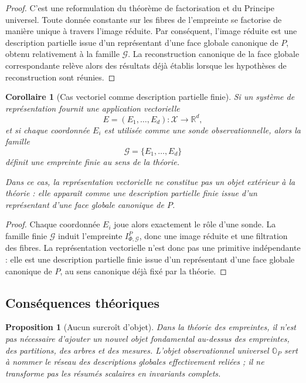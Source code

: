 \documentclass[11pt,a4paper,openany]{book}
\newtheorem{proposition}[definition]{Proposition}
\newtheorem{corollary}[definition]{Corollaire}
\begin{document}
\begin{proof}
C'est une reformulation du théorème de factorisation et du Principe universel. Toute donnée constante sur les fibres de l'empreinte se factorise de manière unique à travers l'image réduite. Par conséquent, l'image réduite est une description partielle issue d'un représentant d'une face globale canonique de \(P\), obtenu relativement à la famille \(\mathcal G\). La reconstruction canonique de la face globale correspondante relève alors des résultats déjà établis lorsque les hypothèses de reconstruction sont réunies.
\end{proof}

\begin{corollary}[Cas vectoriel comme description partielle finie]
Si un système de représentation fournit une application vectorielle
\[
E=(E_1,\ldots,E_d):\mathcal X\to\mathbb R^d,
\]
et si chaque coordonnée \(E_i\) est utilisée comme une sonde observationnelle, alors la famille
\[
\mathcal G=\{E_1,\ldots,E_d\}
\]
définit une empreinte finie au sens de la théorie.

Dans ce cas, la représentation vectorielle ne constitue pas un objet extérieur à la théorie : elle apparaît comme une description partielle finie issue d'un représentant d'une face globale canonique de \(P\).
\end{corollary}

\begin{proof}
Chaque coordonnée \(E_i\) joue alors exactement le rôle d'une sonde. La famille finie \(\mathcal G\) induit l'empreinte \(I_{\Phi,\mathcal G}^P\), donc une image réduite et une filtration des fibres. La représentation vectorielle n'est donc pas une primitive indépendante : elle est une description partielle finie issue d'un représentant d'une face globale canonique de \(P\), au sens canonique déjà fixé par la théorie.
\end{proof}

\subsection{Conséquences théoriques}

\begin{proposition}[Aucun surcroît d'objet]
Dans la théorie des empreintes, il n'est pas nécessaire d'ajouter un nouvel objet fondamental au-dessus des empreintes, des partitions, des arbres et des mesures. L'objet observationnel universel \(\mathbb O_P\) sert à nommer le réseau des descriptions globales effectivement reliées ; il ne transforme pas les résumés scalaires en invariants complets.
\end{proposition}
\end{document}
